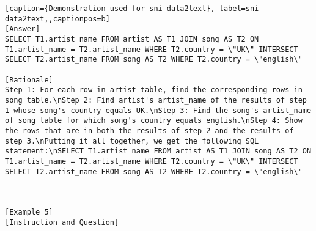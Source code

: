\begin{lstlisting}[caption={Demonstration used for sni data2text}, label=sni data2text,,captionpos=b]
[Answer]
SELECT T1.artist_name FROM artist AS T1 JOIN song AS T2 ON T1.artist_name = T2.artist_name WHERE T2.country = \"UK\" INTERSECT SELECT T2.artist_name FROM song AS T2 WHERE T2.country = \"english\"

[Rationale]
Step 1: For each row in artist table, find the corresponding rows in song table.\nStep 2: Find artist's artist_name of the results of step 1 whose song's country equals UK.\nStep 3: Find the song's artist_name of song table for which song's country equals english.\nStep 4: Show the rows that are in both the results of step 2 and the results of step 3.\nPutting it all together, we get the following SQL statement:\nSELECT T1.artist_name FROM artist AS T1 JOIN song AS T2 ON T1.artist_name = T2.artist_name WHERE T2.country = \"UK\" INTERSECT SELECT T2.artist_name FROM song AS T2 WHERE T2.country = \"english\"



[Example 5]
[Instruction and Question]

    \end{lstlisting}
    




